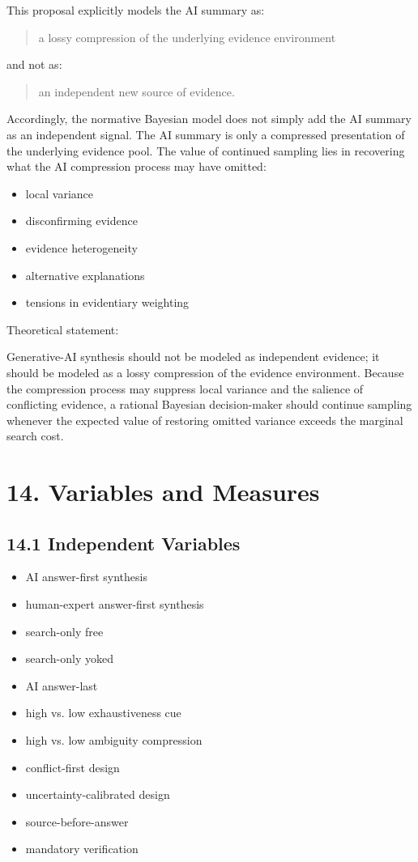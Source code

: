 This proposal explicitly models the AI summary as:
\begin{quote}
a lossy compression of the underlying evidence environment
\end{quote}
and not as:
\begin{quote}
an independent new source of evidence.
\end{quote}

Accordingly, the normative Bayesian model does not simply add the AI summary as an independent signal. The AI summary is only a compressed presentation of the underlying evidence pool. The value of continued sampling lies in recovering what the AI compression process may have omitted:
\begin{itemize}[leftmargin=1.5em]
\item local variance
\item disconfirming evidence
\item evidence heterogeneity
\item alternative explanations
\item tensions in evidentiary weighting
\end{itemize}

Theoretical statement:

Generative-AI synthesis should not be modeled as independent evidence; it should be modeled as a lossy compression of the evidence environment. Because the compression process may suppress local variance and the salience of conflicting evidence, a rational Bayesian decision-maker should continue sampling whenever the expected value of restoring omitted variance exceeds the marginal search cost.

\section*{14. Variables and Measures}

\subsection*{14.1 Independent Variables}

\begin{itemize}[leftmargin=1.5em]
\item AI answer-first synthesis
\item human-expert answer-first synthesis
\item search-only free
\item search-only yoked
\item AI answer-last
\item high vs. low exhaustiveness cue
\item high vs. low ambiguity compression
\item conflict-first design
\item uncertainty-calibrated design
\item source-before-answer
\item mandatory verification
\end{itemize}

